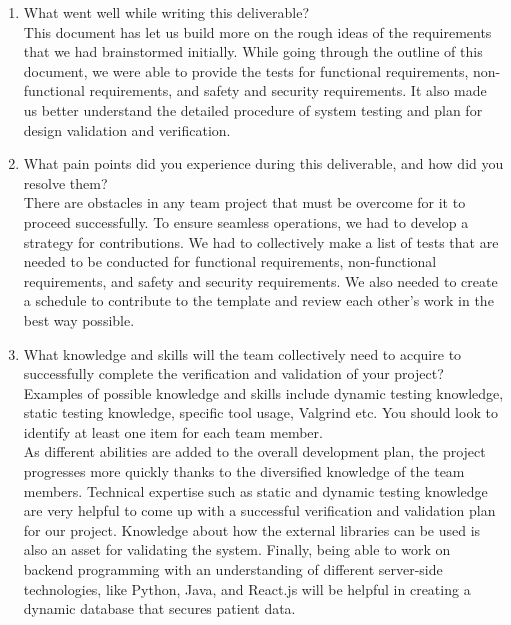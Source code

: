 \documentclass[12pt, titlepage]{article}
\begin{document}
\begin{enumerate}
  \item What went well while writing this deliverable?\\
  This document has let us build more on the rough ideas of the requirements that we had brainstormed initially. While going through the outline of this document, we were able to provide the tests for functional requirements, non-functional requirements, and safety and security requirements. It also made us better understand the detailed procedure of system testing and plan for design validation and verification. 
  
  \item What pain points did you experience during this deliverable, and how did you resolve them?\\
  There are obstacles in any team project that must be overcome for it to proceed successfully. To ensure seamless operations, we had to develop a strategy for contributions. We had to collectively make a list of tests that are needed to be conducted for functional requirements, non-functional requirements, and safety and security requirements. We also needed to create a schedule to contribute to the template and review each other's work in the best way possible.

  \item What knowledge and skills will the team collectively need to acquire to successfully complete the verification and validation of your project? Examples of possible knowledge and skills include dynamic testing knowledge, static testing knowledge, specific tool usage, Valgrind etc.  You should look to identify at least one item for each team member.\\
  As different abilities are added to the overall development plan, the project progresses more quickly thanks to the diversified knowledge of the team members. Technical expertise such as static and dynamic testing knowledge are very helpful to come up with a successful verification and validation plan for our project. Knowledge about how the external libraries can be used is also an asset for validating the system. Finally, being able to work on backend programming with an understanding of different server-side technologies, like Python, Java, and React.js will be helpful in creating a dynamic database that secures patient data.


\end{enumerate}
\end{document}
